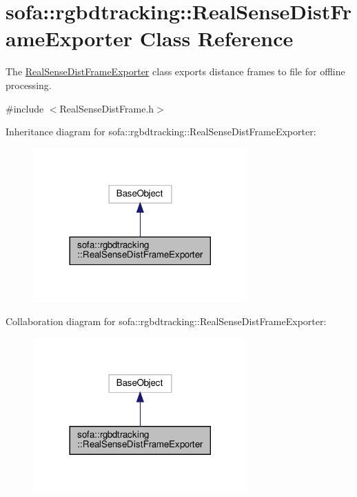 \hypertarget{classsofa_1_1rgbdtracking_1_1_real_sense_dist_frame_exporter}{}\section{sofa\+:\+:rgbdtracking\+:\+:Real\+Sense\+Dist\+Frame\+Exporter Class Reference}
\label{classsofa_1_1rgbdtracking_1_1_real_sense_dist_frame_exporter}


The \hyperlink{classsofa_1_1rgbdtracking_1_1_real_sense_dist_frame_exporter}{Real\+Sense\+Dist\+Frame\+Exporter} class exports distance frames to file for offline processing.  




{\ttfamily \#include $<$Real\+Sense\+Dist\+Frame.\+h$>$}



Inheritance diagram for sofa\+:\+:rgbdtracking\+:\+:Real\+Sense\+Dist\+Frame\+Exporter\+:\nopagebreak
\begin{figure}[H]
\begin{center}
\leavevmode
\includegraphics[width=233pt]{classsofa_1_1rgbdtracking_1_1_real_sense_dist_frame_exporter__inherit__graph}
\end{center}
\end{figure}


Collaboration diagram for sofa\+:\+:rgbdtracking\+:\+:Real\+Sense\+Dist\+Frame\+Exporter\+:\nopagebreak
\begin{figure}[H]
\begin{center}
\leavevmode
\includegraphics[width=233pt]{classsofa_1_1rgbdtracking_1_1_real_sense_dist_frame_exporter__coll__graph}
\end{center}
\end{figure}
